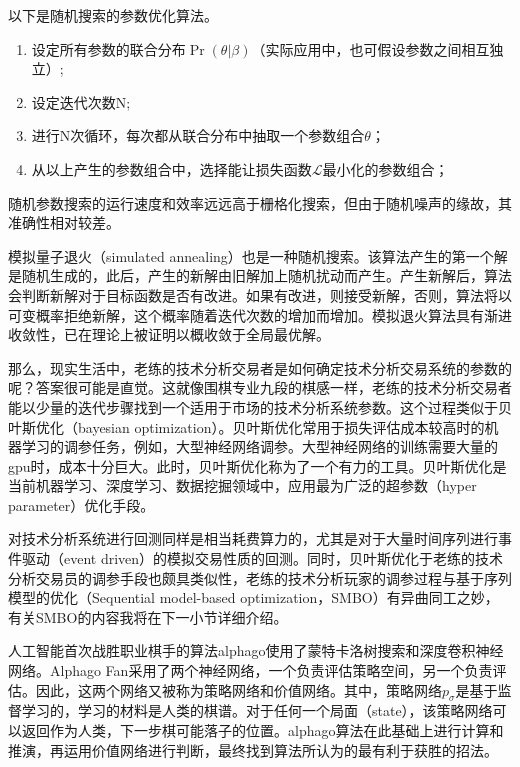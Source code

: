 \documentclass[twoside,longtitle]{LZUthesis}
\begin{document}
以下是随机搜索的参数优化算法\cite{Hastie2004The}。
\begin{enumerate}
	\item 设定所有参数的联合分布$\Pr(\theta|\beta)$（实际应用中，也可假设参数之间相互独立）;
	\item 设定迭代次数N;
	\item 进行N次循环，每次都从联合分布中抽取一个参数组合$\theta$；
	\item 从以上产生的参数组合中，选择能让损失函数$\mathcal{L}$最小化的参数组合；
\end{enumerate}

随机参数搜索的运行速度和效率远远高于栅格化搜索，但由于随机噪声的缘故，其准确性相对较差。

模拟量子退火（simulated annealing）也是一种随机搜索。该算法产生的第一个解是随机生成的，此后，产生的新解由旧解加上随机扰动而产生。产生新解后，算法会判断新解对于目标函数是否有改进。如果有改进，则接受新解，否则，算法将以可变概率拒绝新解，这个概率随着迭代次数的增加而增加。模拟退火算法具有渐进收敛性，已在理论上被证明以概收敛于全局最优解\cite{Hwang1988Simulated}。

那么，现实生活中，老练的技术分析交易者是如何确定技术分析交易系统的参数的呢？答案很可能是直觉。这就像围棋专业九段的棋感一样，老练的技术分析交易者能以少量的迭代步骤找到一个适用于市场的技术分析系统参数。这个过程类似于贝叶斯优化（bayesian optimization）\cite{Pelikan2005Bayesian}。贝叶斯优化常用于损失评估成本较高时的机器学习的调参任务，例如，大型神经网络调参。大型神经网络的训练需要大量的gpu时，成本十分巨大。此时，贝叶斯优化称为了一个有力的工具。贝叶斯优化是当前机器学习、深度学习、数据挖掘领域中，应用最为广泛的超参数（hyper parameter）优化手段。

对技术分析系统进行回测同样是相当耗费算力的，尤其是对于大量时间序列进行事件驱动（event driven）的模拟交易性质的回测。同时，贝叶斯优化于老练的技术分析交易员的调参手段也颇具类似性，老练的技术分析玩家的调参过程与基于序列模型的优化（Sequential model-based optimization，SMBO）有异曲同工之妙，有关SMBO的内容我将在下一小节详细介绍。

人工智能首次战胜职业棋手的算法alphago\cite{2016Mastering}使用了蒙特卡洛树搜索和深度卷积神经网络。Alphago Fan采用了两个神经网络，一个负责评估策略空间，另一个负责评估。因此，这两个网络又被称为策略网络和价值网络。其中，策略网络$p_\sigma$是基于监督学习的，学习的材料是人类的棋谱。对于任何一个局面（state），该策略网络可以返回作为人类，下一步棋可能落子的位置。alphago算法在此基础上进行计算和推演，再运用价值网络进行判断，最终找到算法所认为的最有利于获胜的招法。
\end{document}
